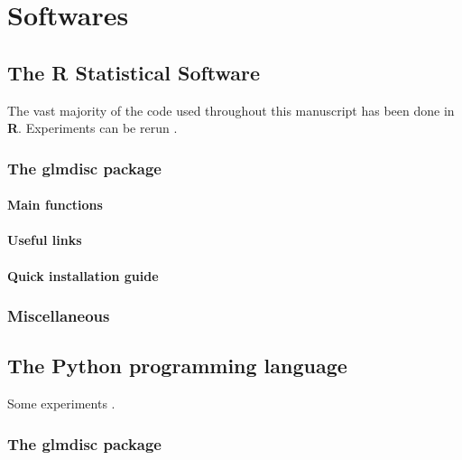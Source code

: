 \chapter{Softwares}

\section{The R Statistical Software}

The vast majority of the code used throughout this manuscript has been done in \textbf{R}. Experiments can be rerun .


\subsection{The glmdisc package}


\subsubsection{Main functions}


\subsubsection{Useful links}


\subsubsection{Quick installation guide}


\subsection{Miscellaneous}




\section{The Python programming language}

Some experiments .


\subsection{The glmdisc package}

